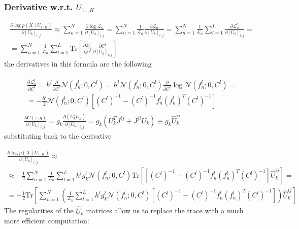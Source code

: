 \documentclass{paper}
\begin{document}
\subsubsection{Derivative w.r.t. $U_{1\dots K}$ }

\begin{equation}
\begin{split}
\frac{\partial \log p(X \mid U_{1..K})}{\partial \left[ U_k \right]_{i,j}} \approx \sum_{n=1}^N \frac{\partial \log \mathcal{L}_n}{\partial \left[ U_k \right]_{i,j}} = \sum_{n=1}^N \frac{1}{\mathcal{L}_n} \frac{\partial \mathcal{L}_n}{\partial \left[ U_k \right]_{i,j}} = \sum_{n=1}^N \frac{1}{\mathcal{L}_n}  \sum_{l=1}^{L} \frac{\partial \mathcal{L}_n^l}{\partial \left[ U_k \right]_{i,j}} = \\
=  \sum_{n=1}^N \frac{1}{\mathcal{L}_n}  \sum_{l=1}^{L} \textrm{Tr} \left[ \frac{\partial \mathcal{L}_n^l}{\partial C^l} \frac{\partial C^l}{\partial \left[ U_k \right]_{i,j}} \right]
\end{split}
\end{equation}
% 
the derivatives in this formula are the following

\begin{eqnarray}
\begin{split}
\frac{\partial \mathcal{L}_n^l}{\partial C^l} = h^l \frac{\partial}{\partial C^l} \mathcal{N}(f_n^l;0,C^l) = h^l \mathcal{N}(f_n^l;0,C^l) \frac{\partial}{\partial C^l} \log \mathcal{N}(f_n^l;0,C^l) = \\
= -\frac{h^l}{2} \mathcal{N}(f_n^l;0,C^l) \left[ (C^l)^{-1} - (C^l)^{-1} f_n^l (f_n^l)^T (C^l)^{-1} \right]
\end{split} \\
\frac{\partial C(z,g)}{\partial \left[ U_k \right]_{i,j}} = g_k \frac{\partial \left( U_k^T U_k \right)}{\partial \left[ U_k \right]_{i,j}} = g_k \left( U_k^T J^{ij} + J^{ji} U_k \right) \equiv g_k \hat U_k^{ij} \label{eq:cv_deriv}
\end{eqnarray}
%
substituting back to the derivative

\begin{equation}
\begin{split}
\frac{\partial \log p(X \mid U_{1..K})}{\partial \left[ U_k \right]_{i,j}} \approx \\
\approx  -\frac{1}{2} \sum_{n=1}^N \frac{1}{\mathcal{L}_n}  \sum_{l=1}^{L} h^l g^l_k \mathcal{N}(f_n^l;0,C^l)  \textrm{Tr} \left[ \left[ (C^l)^{-1} - (C^l)^{-1} f_n^l (f_n^l)^T (C^l)^{-1} \right] \hat U_k^{ij} \right] = \\
= -\frac{1}{2} \textrm{Tr} \left[ \sum_{n=1}^N \left(\frac{1}{\mathcal{L}_n}  \sum_{l=1}^{L} h^l g^l_k \mathcal{N}(f_n^l;0,C^l)   \left[ (C^l)^{-1} - (C^l)^{-1} f_n^l (f_n^l)^T (C^l)^{-1} \right] \right) \hat U_k^{ij} \right]
\end{split}
\end{equation}
%
The regularities of the $\hat U_k$ matrices allow us to replace the trace with a much more efficient computation:
\end{document}
